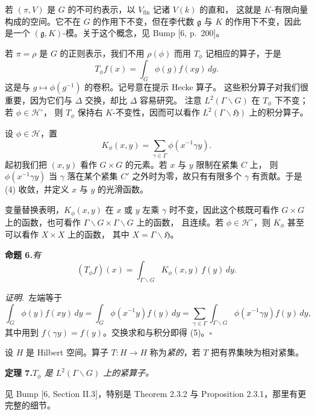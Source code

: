 若 $(\pi,V)$ 是 $G$ 的不可约表示，以 $V_{\mathrm{fin}}$ 记诸 $V(k)$ 的直和，
这就是 $K$-有限向量构成的空间。它不在 $G$ 的作用下不变，但在李代数 $\mathfrak{g}$ 与 $K$
的作用下不变，因此是一个 $(\mathfrak{g},K)$-模。关于这个概念，见 Bump [6, p.\ 200]。

若 $\pi=\rho$ 是 $G$ 的正则表示，我们不用 $\rho(\phi)$ 而用 $T_{\phi}$ 记相应的算子，于是
\[
T_{\phi}f(x)=\int_{G}\phi(g)f(xg)\,dg .
\]
这是与 $g\mapsto\phi(g^{-1})$ 的卷积。记号意在提示 Hecke 算子。
这些积分算子对我们很重要，因为它们与 $\Delta$ 交换，却比 $\Delta$ 容易研究。
注意 $L^{2}(\Gamma\backslash G)$ 在 $T_{\phi}$ 下不变；若 $\phi\in\mathcal{H}^{\circ}$，
则 $T_{\phi}$ 保持右 $K$-不变性，因而可以看作 $L^{2}(\Gamma\backslash\mathfrak{H})$ 上的积分算子。

设 $\phi\in\mathcal{H}$，置
\begin{equation}\tag{4}
K_{\phi}(x,y)=\sum_{\gamma\in\Gamma}\phi(x^{-1}\gamma y).
\end{equation}
起初我们把 $(x,y)$ 看作 $G\times G$ 的元素。若 $x$ 与 $y$ 限制在紧集 $C$ 上，
则 $\phi(x^{-1}\gamma y)$ 当 $\gamma$ 落在某个紧集 $C'$ 之外时为零，故只有有限多个 $\gamma$
有贡献。于是 (4) 收敛，并定义 $x$ 与 $y$ 的光滑函数。

变量替换表明，$K_{\phi}(x,y)$ 在 $x$ 或 $y$ 左乘 $\gamma$ 时不变，因此这个核既可看作
$G\times G$ 上的函数，也可看作 $\Gamma\backslash G\times\Gamma\backslash G$ 上的函数，
且连续。若 $\phi\in\mathcal{H}^{\circ}$，则 $K_{\phi}$ 甚至可以看作 $X\times X$ 上的函数，
其中 $X=\Gamma\backslash\mathfrak{H}$。

\par\medskip\noindent\textbf{命题 6.}\quad\emph{有}
\begin{equation}\tag{5}
(T_{\phi}f)(x)=\int_{\Gamma\backslash G}K_{\phi}(x,y)\,f(y)\,dy .
\end{equation}

\smallskip
\noindent\emph{证明.}\ 左端等于
\[
\int_{G}\phi(y)f(xy)\,dy=\int_{G}\phi(x^{-1}y)f(y)\,dy
=\sum_{\gamma\in\Gamma}\int_{\Gamma\backslash G}\phi(x^{-1}\gamma y)f(y)\,dy,
\]
其中用到 $f(\gamma y)=f(y)$。交换求和与积分即得 (5)。\hfill$\square$

设 $H$ 是 Hilbert 空间。算子 $T:H\to H$ 称为\emph{紧的}，若 $T$ 把有界集映为相对紧集。

\par\medskip\noindent\textbf{定理 7.}\quad\emph{$T_{\phi}$ 是 $L^{2}(\Gamma\backslash G)$
上的紧算子。}

\smallskip
见 Bump [6, Section II.3]，特别是 Theorem 2.3.2 与 Proposition 2.3.1，那里有更完整的细节。


